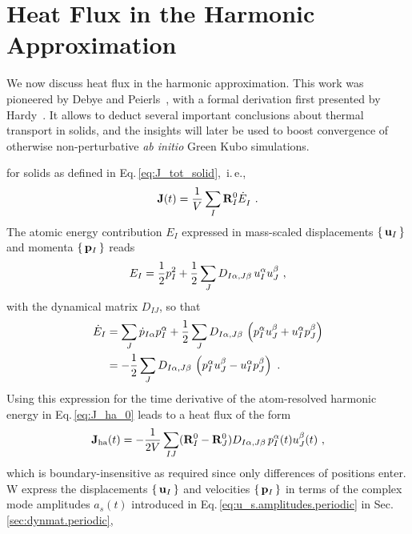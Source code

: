 \section{Heat Flux in the Harmonic Approximation}
We now discuss heat flux in the harmonic approximation. This work was pioneered by Debye and Peierls~\cite{Debye1914,Peierls1929}, with a formal derivation first presented by Hardy~\cite{Hardy1963}. It allows to deduct several important conclusions about thermal transport in solids, and the insights will later be used to boost convergence of otherwise non-perturbative \emph{ab initio} Green Kubo simulations.

 for solids as defined in Eq.\,\eqref{eq:J_tot_solid},~i.\,e.,
\begin{align}
	\b J (t) 
		= \frac{1}{V} \sum_I \b R_I^0 \fD{\dot{E}}_I~.
		\label{eq:J_ha_0}
\end{align}
The atomic energy contribution $E_I$ expressed in mass-scaled displacements $\set{{\bf u}_I}$ and momenta $\set{{\bf p}_I}$ reads
\begin{align}
	E_I = \frac{1}{2} p_I^2 + \frac{1}{2} \sum_J D_{I \alpha , J \beta} \, u_I^\alpha u_J^\beta~,
\end{align}
with the dynamical matrix $D_{IJ}$, so that
\begin{align}
	\dot E_I 
		&= \sum_J \dot{p}_{I\alpha} p_I^\alpha 
		+ \halb \sum_J D_{I \alpha , J \beta} \, 
			\left( p_I^\alpha u_J^\beta + u_I^\alpha p_J^\beta\right) \nonumber \\ 
		&= -\halb \sum_J D_{I \alpha , J \beta} \, 
		\left( p_I^\alpha u_J^\beta - u_I^\alpha p_J^\beta\right) ~.
		\label{eq:dotE_I}
\end{align}
Using this expression for the time derivative of the atom-resolved harmonic energy  in Eq.\,\eqref{eq:J_ha_0} leads to a heat flux of the form
\begin{align}
    \b J_{\rm ha} (t) = - \frac{1}{2V} \sum_{IJ} (\b R_I^0 - \b R_J^0) D_{I \alpha, J \beta} \, p_I^\alpha (t) u_J^\beta (t)~,
   \label{eq:J_ha_r}
\end{align}
which is boundary-insensitive as required since only differences of positions enter.
W express the displacements $\set {{\bf u}_I}$ and velocities $\set{{\bf p}_I}$ in terms of the complex mode amplitudes $a_s (t)$ introduced in Eq.\,\eqref{eq:u_s.amplitudes.periodic} in Sec.\,\ref{sec:dynmat.periodic},
